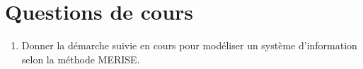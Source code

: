 \section*{Questions de cours}

\begin{enumerate}
    \item Donner la démarche suivie en cours pour modéliser un système d'information selon la méthode MERISE.
\end{enumerate}
